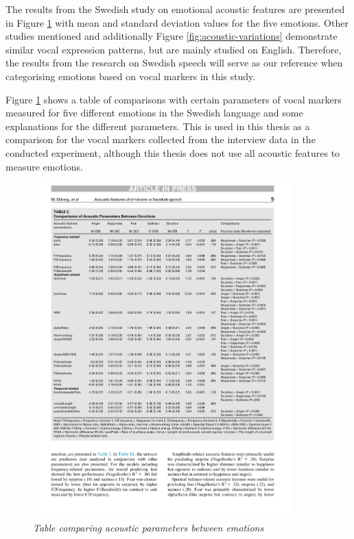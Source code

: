The results from the Swedish study \autocite{Ekberg2023} on emotional acoustic features are presented in Figure \ref{fig:compare-acoustic-parameters} with mean and standard deviation values for the five emotions. Other studies mentioned \autocites{Banse1996}{Kamilolu2020}{Scherer2003} and additionally Figure \ref{fig:acoustic-variations} \autocite{Khalil2019} demonstrate similar vocal expression patterns, but are mainly studied on English. 
Therefore, the results from the research on Swedish speech will serve as our reference when categorising emotions based on vocal markers in this study. 

 Figure \ref{fig:compare-acoustic-parameters} \autocite{Ekberg2023} shows a table of comparisons with certain parameters of vocal markers measured for five different emotions in the Swedish language and some explanations for the different parameters. This is used in this thesis as a comparison for the vocal markers collected from the interview data in the conducted experiment, although this thesis does not use all acoustic features to measure emotions.
 
\begin{figure}[H]
    \centering
    \includegraphics[width=10cm]{png/theoretical/table-acoustic.pdf}
    \caption{\textit{Table comparing acoustic parameters between emotions} \autocite{Ekberg2023}}
    \label{fig:compare-acoustic-parameters}
\end{figure}

